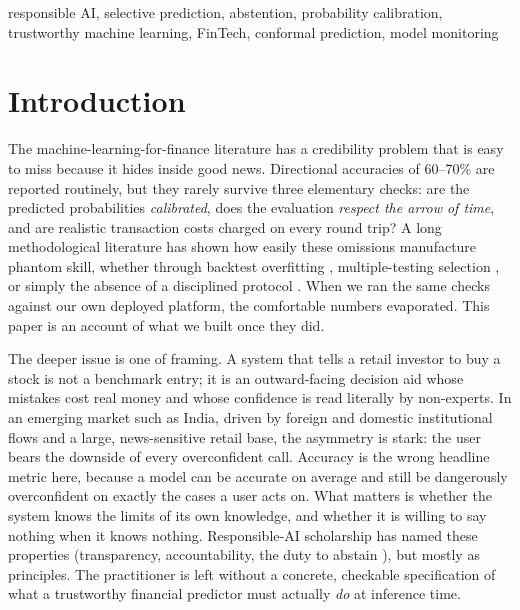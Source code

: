 \documentclass[conference]{IEEEtran}
\begin{document}
\begin{IEEEkeywords}
responsible AI, selective prediction, abstention, probability calibration,
trustworthy machine learning, FinTech, conformal prediction, model monitoring
\end{IEEEkeywords}

\section{Introduction}
The machine-learning-for-finance literature has a credibility problem that is
easy to miss because it hides inside good news. Directional accuracies of
60--70\% are reported routinely, but they rarely survive three elementary checks:
are the predicted probabilities \emph{calibrated}, does the evaluation
\emph{respect the arrow of time}, and are realistic transaction costs charged on
every round trip? A long methodological literature has shown how easily these
omissions manufacture phantom skill, whether through backtest overfitting
\cite{bailey2014}, multiple-testing selection \cite{harvey2016}, or simply the
absence of a disciplined protocol \cite{arnott2019,lopezdeprado2018}. When we ran
the same checks against our own deployed platform, the comfortable numbers
evaporated. This paper is an account of what we built once they did.

The deeper issue is one of framing. A system that tells a retail investor to buy a
stock is not a benchmark entry; it is an outward-facing decision aid whose mistakes
cost real money and whose confidence is read literally by non-experts. In an
emerging market such as India, driven by foreign and domestic institutional flows
and a large, news-sensitive retail base, the asymmetry is stark: the user bears the
downside of every overconfident call. Accuracy is the wrong headline metric here,
because a model can be accurate on average and still be dangerously overconfident on
exactly the cases a user acts on. What matters is whether the system knows the
limits of its own knowledge, and whether it is willing to say nothing when it knows
nothing. Responsible-AI scholarship has named these properties (transparency,
accountability, the duty to abstain \cite{jobin2019,amodei2016,mitchell2019}), but
mostly as principles. The practitioner is left without a concrete, checkable
specification of what a trustworthy financial predictor must actually \emph{do} at
inference time.
\end{document}
